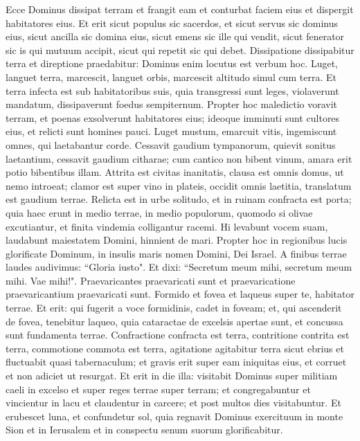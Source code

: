 \begin{biblechapter}  
\verse Ecce Dominus dissipat terram et frangit eam et conturbat faciem eius et dispergit habitatores eius. 
\verse Et erit sicut populus sic sacerdos, et sicut servus sic dominus eius, sicut ancilla sic domina eius, sicut emens sic ille qui vendit, sicut fenerator sic is qui mutuum accipit, sicut qui repetit sic qui debet. 
\verse Dissipatione dissipabitur terra et direptione praedabitur: Dominus enim locutus est verbum hoc. 
\verse Luget, languet terra, marcescit, languet orbis, marcescit altitudo simul cum terra. 
\verse Et terra infecta est sub habitatoribus suis, quia transgressi sunt leges, violaverunt mandatum, dissipaverunt foedus sempiternum. 
\verse Propter hoc maledictio voravit terram, et poenas exsolverunt habitatores eius; ideoque imminuti sunt cultores eius, et relicti sunt homines pauci. 
\verse Luget mustum, emarcuit vitis, ingemiscunt omnes, qui laetabantur corde. 
\verse Cessavit gaudium tympanorum, quievit sonitus laetantium, cessavit gaudium citharae; 
\verse cum cantico non bibent vinum, amara erit potio bibentibus illam. 
\verse Attrita est civitas inanitatis, clausa est omnis domus, ut nemo introeat; 
\verse clamor est super vino in plateis, occidit omnis laetitia, translatum est gaudium terrae. 
\verse Relicta est in urbe solitudo, et in ruinam confracta est porta; 
\verse quia haec erunt in medio terrae, in medio populorum, quomodo si olivae excutiantur, et finita vindemia colligantur racemi. 
\verse Hi levabunt vocem suam, laudabunt maiestatem Domini, hinnient de mari. 
\verse Propter hoc in regionibus lucis glorificate Dominum, in insulis maris nomen Domini, Dei Israel. 
\verse A finibus terrae laudes audivimus: “Gloria iusto". Et dixi: “Secretum meum mihi, secretum meum mihi. Vae mihi!". Praevaricantes praevaricati sunt et praevaricatione praevaricantium praevaricati sunt. 
\verse Formido et fovea et laqueus super te, habitator terrae. 
\verse Et erit: qui fugerit a voce formidinis, cadet in foveam; et, qui ascenderit de fovea, tenebitur laqueo, quia cataractae de excelsis apertae sunt, et concussa sunt fundamenta terrae. 
\verse Confractione confracta est terra, contritione contrita est terra, commotione commota est terra, 
\verse agitatione agitabitur terra sicut ebrius et fluctuabit quasi tabernaculum; et gravis erit super eam iniquitas eius, et corruet et non adiciet ut resurgat. 
\verse Et erit in die illa: visitabit Dominus super militiam caeli in excelso et super reges terrae super terram; 
\verse et congregabuntur et vincientur in lacu et claudentur in carcere; et post multos dies visitabuntur. 
\verse Et erubescet luna, et confundetur sol, quia regnavit Dominus exercituum in monte Sion et in Ierusalem et in conspectu senum suorum glorificabitur. 
\end{biblechapter}

